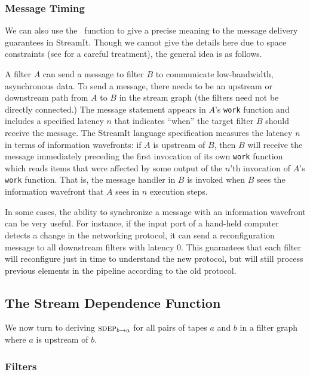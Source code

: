 \subsubsection{Message Timing}
\label{sec:messagesemantics}

We can also use the \sdep~function to give a precise meaning to the
message delivery guarantees in StreamIt.  Though we cannot give the
details here due to space constraints (see \cite{streamittech} for a
careful treatment), the general idea is as follows.

A filter $A$ can send a message to filter $B$ to communicate
low-bandwidth, asynchronous data.  To send a message, there needs to
be an upstream or downstream path from $A$ to $B$ in the stream graph
(the filters need not be directly connected.)  The message statement
appears in $A$'s {\tt work} function and includes a specified latency
$n$ that indicates ``when'' the target filter $B$ should receive the
message.  The StreamIt language specification measures the latency $n$
in terms of information wavefronts: if $A$ is upstream of $B$, then
$B$ will receive the message immediately preceding the first
invocation of its own {\tt work} function which reads items that were
affected by some output of the $n$'th invocation of $A$'s {\tt work}
function.  That is, the message handler in $B$ is invoked when $B$
sees the information wavefront that $A$ sees in $n$ execution steps.

In some cases, the ability to synchronize a message with an
information wavefront can be very useful.  For instance, if the input
port of a hand-held computer detects a change in the networking
protocol, it can send a reconfiguration message to all downstream
filters with latency 0.  This guarantees that each filter will
reconfigure just in time to understand the new protocol, but will
still process previous elements in the pipeline according to the old
protocol.

\subsection{The Stream Dependence Function}
\label{sec:derivemin}

We now turn to deriving $\mi{a}{b}$ for all pairs of tapes $a$ and $b$
in a filter graph where $a$ is upstream of $b$.

\subsubsection{Filters}

